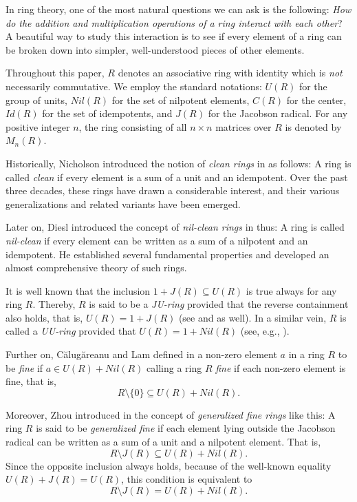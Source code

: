 \documentclass[12pt]{amsart}
\theoremstyle{definition}
\begin{document}
In ring theory, one of the most natural questions we can ask is the following: \textit{How do the addition and multiplication operations of a ring interact with each other}? A beautiful way to study this interaction is to see if every element of a ring can be broken down into simpler, well-understood pieces of other elements.

Throughout this paper, \( R \) denotes an associative ring with identity which is \textit{not} necessarily commutative. We employ the standard notations: \( U(R) \) for the group of units, \( Nil(R) \) for the set of nilpotent elements, \( C(R) \) for the center, \( Id(R) \) for the set of idempotents, and \( J(R) \) for the Jacobson radical. For any positive integer \( n \), the ring consisting of all \( n \times n \) matrices over \( R \) is denoted by \( M_{n}(R) \).

Historically, Nicholson introduced the notion of \textit{clean rings} in \cite{nic} as follows: A ring is called \textit{clean} if every element is a sum of a unit and an idempotent. Over the past three decades, these rings have drawn a considerable interest, and their various generalizations and related variants have been emerged.

Later on, Diesl introduced the concept of \textit{nil-clean rings} in \cite{di} thus: A ring is called \textit{nil-clean} if every element can be written as a sum of a nilpotent and an idempotent. He established several fundamental properties and developed an almost comprehensive theory of such rings.

It is well known that the inclusion \( 1 + J(R) \subseteq U(R) \) is true always for any ring \( R \). Thereby, \( R \) is said to be a \textit{JU-ring} provided that the reverse containment also holds, that is, \( U(R) = 1 + J(R) \) (see \cite{D} and \cite{klm} as well). In a similar vein, \( R \) is called a \textit{UU-ring} provided that \( U(R) = 1 + Nil(R) \) (see, e.g., \cite{dl}).

Further on, C\u{a}lug\u{a}reanu and Lam defined in \cite{Clam} a non-zero element \( a \) in a ring \( R \) to be \textit{fine} if \( a \in U(R) + Nil(R) \) calling a ring \( R \) \textit{fine} if each non-zero element is fine, that is, \[ R \setminus \{0\} \subseteq U(R) + Nil(R) .\]

Moreover, Zhou introduced in \cite{z} the concept of \textit{generalized fine rings} like this: A ring \( R \) is said to be \textit{generalized fine} if each element lying outside the Jacobson radical can be written as a sum of a unit and a nilpotent element. That is,
\[
R \setminus J(R) \subseteq U(R) + Nil(R).
\]
Since the opposite inclusion always holds, because of the well-known equality $U(R)+J(R)=U(R)$, this condition is equivalent to
\[
R \setminus J(R) = U(R) + Nil(R).
\]
\end{document}
